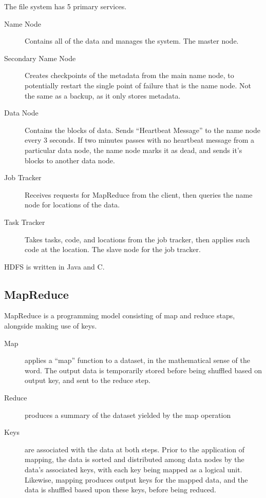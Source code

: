 \documentclass[10pt,a4paper]{article}
\begin{document}
The file system has 5 primary services.

\begin{description}
\item[Name Node] Contains all of the data and manages the system. The
  master node.
  \item[Secondary Name Node] Creates checkpoints of the metadata from
  the main name node, to potentially restart the single point of
  failure that is the name node. Not the same as a backup, as it only
  stores metadata.
\item[Data Node] Contains the blocks of data. Sends ``Heartbeat
  Message'' to the name node every 3 seconds. If two minutes passes
  with no heartbeat message from a particular data node, the name node
  marks it as dead, and sends it's blocks to another data node.
\item[Job Tracker] Receives requests for MapReduce from the client,
  then queries the name node for locations of the data.
\item[Task Tracker] Takes tasks, code, and locations from the job
  tracker, then applies such code at the location. The slave node for
  the job tracker.
\end{description}

HDFS is written in Java and C.

\subsection{MapReduce}
\label{sec:mapreduce}

MapReduce is a programming model consisting of map and reduce staps,
alongside making use of keys.

\begin{description}
\item[Map] applies a ``map'' function to a dataset, in the
  mathematical sense of the word. The output data is temporarily
  stored before being shuffled based on output key, and sent to the
  reduce step.
\item[Reduce] produces a summary of the dataset yielded by the map operation
\item[Keys] are associated with the data at both steps. Prior to the
  application of mapping, the data is sorted and distributed among
  data nodes by the data's associated keys, with each key being mapped
  as a logical unit. Likewise, mapping produces output keys for the
  mapped data, and the data is shuffled based upon these keys, before
  being reduced.
\end{description}
\end{document}

